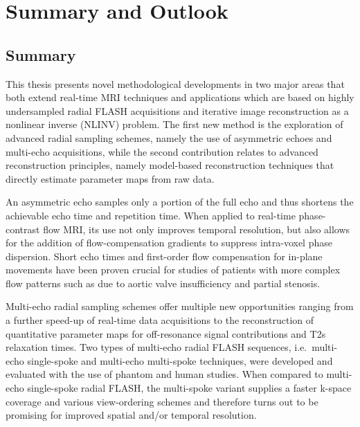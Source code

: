 \chapter{Summary and Outlook} \label{Chp:sum}

\section{Summary}
This thesis presents novel methodological developments in two major areas that both extend real-time MRI techniques and applications which are based on highly undersampled radial FLASH acquisitions and iterative image reconstruction as a nonlinear inverse (\acs{NLINV}) problem. The first new method is the exploration of advanced radial sampling schemes, namely the use of asymmetric echoes and multi-echo acquisitions, while the second contribution relates to advanced reconstruction principles, namely model-based reconstruction techniques that directly estimate parameter maps from raw data.

An asymmetric echo samples only a portion of the full echo and thus shortens the achievable echo time and repetition time. When applied to real-time phase-contrast flow MRI, its use not only improves temporal resolution, but also allows for the addition of flow-compensation gradients to suppress intra-voxel phase dispersion. Short echo times and first-order flow compensation for in-plane movements have been proven crucial for studies of patients with more complex flow patterns such as due to aortic valve insufficiency and partial stenosis.

Multi-echo radial sampling schemes offer multiple new opportunities ranging from a further speed-up of real-time data acquisitions to the reconstruction of quantitative parameter maps for off-resonance signal contributions and \acs{T2s} relaxation times. Two types of multi-echo radial FLASH sequences, i.e.~multi-echo single-spoke and multi-echo multi-spoke techniques, were developed and evaluated with the use of phantom and human studies. When compared to multi-echo single-spoke radial FLASH, the multi-spoke variant supplies a faster k-space coverage and various view-ordering schemes and therefore turns out to be promising for improved spatial and/or temporal resolution.

